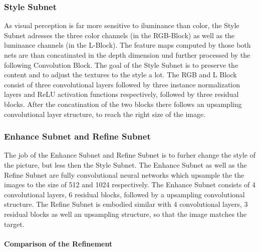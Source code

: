 \documentclass[11pt]{article}
\begin{document}
\subsubsection{Style Subnet}\label{style-subnet}

As visual perception is far more sensitive to iluminance than color, the
Style Subnet adresses the three color channels (in the RGB-Block) as
well as the luminance channels (in the L-Block). The feature maps
computed by those both nets are than concatinated in the depth dimension
und further processed by the following Convolution Block. The goal of
the Style Subnet is to preserve the content and to adjust the textures
to the style a lot. The RGB and L Block consist of three convolutional
layers followed by three instance normalization layers and ReLU
activation functions respectively, followed by three residual blocks.
After the concatination of the two blocks there follows an upsampling
convolutional layer structure, to reach the right size of the image.

\subsubsection{Enhance Subnet and Refine
Subnet}\label{enhance-subnet-and-refine-subnet}

The job of the Enhance Subnet and Refine Subnet is to furher change the
style of the picture, but less then the Style Subnet. The Enhance Subnet
as well as the Refine Subnet are fully convolutional neural networks
which upsample the the images to the size of 512 and 1024 respectively.
The Enhance Subnet consists of 4 convolutional layers, 6 residual
blocks, followed by a upsampling convolutional structure. The Refine
Subnet is embodied similar with 4 convolutional layers, 3 residual
blocks as well an upsampling structure, so that the image matches the
target.

\paragraph{Comparison of the
Refinement}\label{comparison-of-the-refinement}
\end{document}
